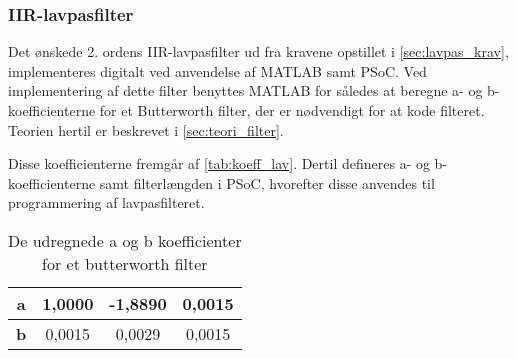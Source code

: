 \subsubsection{IIR-lavpasfilter}
Det ønskede 2. ordens IIR-lavpasfilter ud fra kravene opstillet i \autoref{sec:lavpas_krav}, implementeres digitalt ved anvendelse af MATLAB samt PSoC.
Ved implementering af dette filter benyttes MATLAB for således at beregne a- og b-koefficienterne for et Butterworth filter, der er nødvendigt for at kode filteret. Teorien hertil er beskrevet i \autoref{sec:teori_filter}. 


Disse koefficienterne fremgår af \autoref{tab:koeff_lav}. Dertil defineres a- og b-koefficienterne samt filterlængden i PSoC, hvorefter disse anvendes til programmering af lavpasfilteret. 

\begin{table}[H]
\centering
\begin{tabular}{|c|c|c|c|}
\hline
\textbf{a} & 1,0000 & -1,8890 & 0,0015 \\ \hline
\textbf{b} & 0,0015 & 0,0029  & 0,0015 \\ \hline
\end{tabular}
\caption{De udregnede a og b koefficienter for et butterworth filter}
\label{tab:koeff_lav}
\end{table}